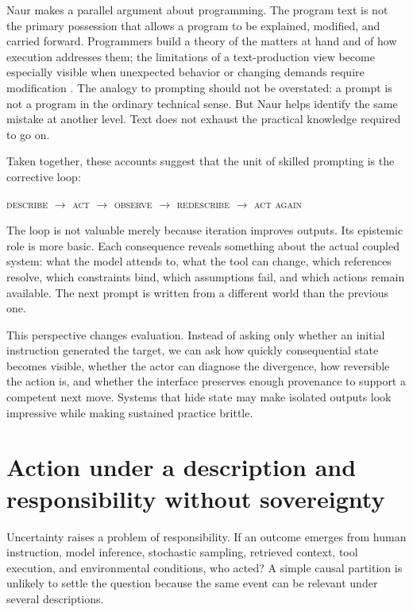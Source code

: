 \documentclass[11pt]{article}
\begin{document}
Naur makes a parallel argument about programming. The program text is not the primary possession that allows a program to be explained, modified, and carried forward. Programmers build a theory of the matters at hand and of how execution addresses them; the limitations of a text-production view become especially visible when unexpected behavior or changing demands require modification \citep{naur1985}. The analogy to prompting should not be overstated: a prompt is not a program in the ordinary technical sense. But Naur helps identify the same mistake at another level. Text does not exhaust the practical knowledge required to go on.

Taken together, these accounts suggest that the unit of skilled prompting is the corrective loop:

\begin{center}
\textsc{describe $\rightarrow$ act $\rightarrow$ observe $\rightarrow$ redescribe $\rightarrow$ act again}
\end{center}

The loop is not valuable merely because iteration improves outputs. Its epistemic role is more basic. Each consequence reveals something about the actual coupled system: what the model attends to, what the tool can change, which references resolve, which constraints bind, which assumptions fail, and which actions remain available. The next prompt is written from a different world than the previous one.

This perspective changes evaluation. Instead of asking only whether an initial instruction generated the target, we can ask how quickly consequential state becomes visible, whether the actor can diagnose the divergence, how reversible the action is, and whether the interface preserves enough provenance to support a competent next move. Systems that hide state may make isolated outputs look impressive while making sustained practice brittle.

\section{Action under a description and responsibility without sovereignty}
Uncertainty raises a problem of responsibility. If an outcome emerges from human instruction, model inference, stochastic sampling, retrieved context, tool execution, and environmental conditions, who acted? A simple causal partition is unlikely to settle the question because the same event can be relevant under several descriptions.
\end{document}
